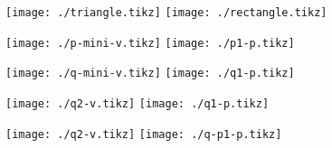 \documentclass{article}
\begin{document}
\texttt{[image: ./triangle.tikz]}
\texttt{[image: ./rectangle.tikz]}

\texttt{[image: ./p-mini-v.tikz]}
\texttt{[image: ./p1-p.tikz]}

\texttt{[image: ./q-mini-v.tikz]}
\texttt{[image: ./q1-p.tikz]}

\texttt{[image: ./q2-v.tikz]}
\texttt{[image: ./q1-p.tikz]}

\texttt{[image: ./q2-v.tikz]}
\texttt{[image: ./q-p1-p.tikz]}
\end{document}
